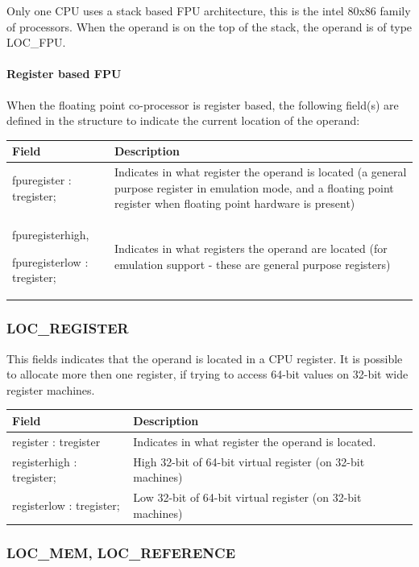 \documentclass [a4paper,12pt]{article}
\begin{document}
Only one CPU uses a stack based FPU architecture, this is the intel 80x86
family of processors. When the operand is on the top of the stack, the
operand is of type LOC{\_}FPU.

\paragraph{Register based FPU}

When the floating point co-processor is register based, the following
field(s) are defined in the structure to indicate the current location of
the operand:

\begin{longtable}{|l|p{7cm}|}
\hline
Field   & Description \\
\hline
\endhead
\hline
\endfoot
\textsf{fpuregister : tregister;}&
    Indicates in what register the operand is located (a general purpose
    register in emulation mode, and a floating point register when floating
    point hardware is present) \\
\textsf{fpuregisterhigh, } \par \textsf{fpuregisterlow : tregister;}&
    Indicates in what registers the operand are located (for emulation
    support - these are general purpose registers)
\end{longtable}

\subsubsection{LOC{\_}REGISTER}
\label{subsubsec:mylabel20}

This fields indicates that the operand is located in a CPU register. It is
possible to allocate more then one register, if trying to access 64-bit
values on 32-bit wide register machines.

\begin{longtable}{|l|p{10cm}|}
\hline
Field   & Description \\
\hline
\endhead
\hline
\endfoot
\textsf{register : tregister}&
    Indicates in what register the operand is located. \\
\textsf{registerhigh : tregister;}&
    High 32-bit of 64-bit virtual register (on 32-bit machines) \\
\textsf{registerlow : tregister;}&
    Low 32-bit of 64-bit virtual register (on 32-bit machines)
\end{longtable}

\subsubsection{LOC{\_}MEM, LOC{\_}REFERENCE}
\label{subsubsec:mylabel21}
\end{document}
